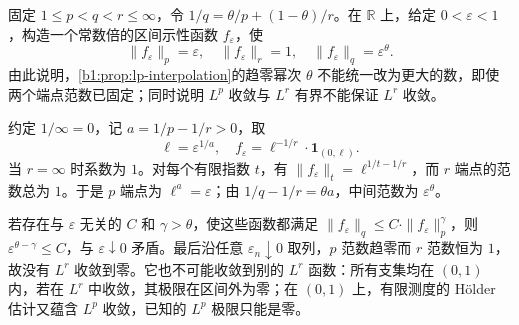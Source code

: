 \begin{exercise}\label{b1:ex:10-interpolation}
固定 \(1\le p<q<r\le\infty\)，令 \(1/q=\theta/p+(1-\theta)/r\)。在 \(\mathbb R\) 上，给定 \(0<\varepsilon<1\)，构造一个常数倍的区间示性函数 \(f_\varepsilon\)，使
\[
 \|f_\varepsilon\|_p=\varepsilon,\quad
 \|f_\varepsilon\|_r=1,\quad
 \|f_\varepsilon\|_q=\varepsilon^\theta.
\]
由此说明，\cref{b1:prop:lp-interpolation}的趋零幂次 \(\theta\) 不能统一改为更大的数，即使两个端点范数已固定；同时说明 \(L^p\) 收敛与 \(L^r\) 有界不能保证 \(L^r\) 收敛。
\end{exercise}
\begin{solution}
约定 \(1/\infty=0\)，记 \(a=1/p-1/r>0\)，取
\[
 \ell=\varepsilon^{1/a},\quad
 f_\varepsilon=\ell^{-1/r}\cdot\mathbf1_{(0,\ell)}.
\]
当 \(r=\infty\) 时系数为 \(1\)。对每个有限指数 \(t\)，有
\(\|f_\varepsilon\|_t=\ell^{1/t-1/r}\)，而 \(r\) 端点的范数总为 \(1\)。于是 \(p\) 端点为 \(\ell^a=\varepsilon\)；由 \(1/q-1/r=\theta a\)，中间范数为 \(\varepsilon^\theta\)。

若存在与 \(\varepsilon\) 无关的 \(C\) 和 \(\gamma>\theta\)，使这些函数都满足 \(\|f_\varepsilon\|_q\le C\cdot\|f_\varepsilon\|_p^\gamma\)，则 \(\varepsilon^{\theta-\gamma}\le C\)，与 \(\varepsilon\downarrow0\) 矛盾。最后沿任意 \(\varepsilon_n\downarrow0\) 取列，\(p\) 范数趋零而 \(r\) 范数恒为 \(1\)，故没有 \(L^r\) 收敛到零。它也不可能收敛到别的 \(L^r\) 函数：所有支集均在 \((0,1)\) 内，若在 \(L^r\) 中收敛，其极限在区间外为零；在 \((0,1)\) 上，有限测度的 Hölder 估计又蕴含 \(L^p\) 收敛，已知的 \(L^p\) 极限只能是零。
\end{solution}

